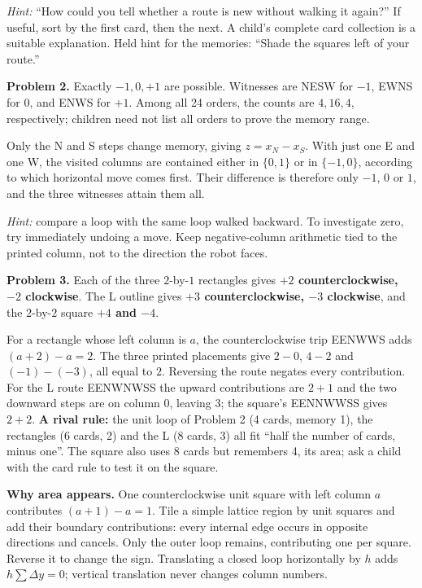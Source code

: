 \documentclass[11pt,letterpaper]{article}
\newcommand{\answer}[1]{\par\vspace{3pt}\textbf{Problem #1.} }
\begin{document}
\textit{Hint:} ``How could you tell whether a route is new without walking it again?'' If useful, sort by the first card, then the next. A child's complete card collection is a suitable explanation. Held hint for the memories: ``Shade the squares left of your route.''

\answer{2} Exactly \textbf{$-1,0,+1$} are possible. Witnesses are NESW for $-1$, EWNS for $0$, and ENWS for $+1$. Among all 24 orders, the counts are $4,16,4$, respectively; children need not list all orders to prove the memory range.

Only the N and S steps change memory, giving $z=x_N-x_S$. With just one E and one W, the visited columns are contained either in $\{0,1\}$ or in $\{-1,0\}$, according to which horizontal move comes first. Their difference is therefore only $-1$, $0$ or $1$, and the three witnesses attain them all.

\textit{Hint:} compare a loop with the same loop walked backward. To investigate zero, try immediately undoing a move. Keep negative-column arithmetic tied to the printed column, not to the direction the robot faces.

\answer{3} Each of the three $2$-by-$1$ rectangles gives \textbf{$+2$ counterclockwise, $-2$ clockwise}. The L outline gives \textbf{$+3$ counterclockwise, $-3$ clockwise}, and the $2$-by-$2$ square \textbf{$+4$ and $-4$}.

For a rectangle whose left column is $a$, the counterclockwise trip EENWWS adds $(a+2)-a=2$. The three printed placements give $2-0$, $4-2$ and $(-1)-(-3)$, all equal to $2$. Reversing the route negates every contribution. For the L route EENWNWSS the upward contributions are $2+1$ and the two downward steps are on column $0$, leaving $3$; the square's EENNWWSS gives $2+2$. \textbf{A rival rule:} the unit loop of Problem 2 (4 cards, memory 1), the rectangles (6 cards, 2) and the L (8 cards, 3) all fit ``half the number of cards, minus one''. The square also uses 8 cards but remembers 4, its area; ask a child with the card rule to test it on the square.

\textbf{Why area appears.} One counterclockwise unit square with left column $a$ contributes $(a+1)-a=1$. Tile a simple lattice region by unit squares and add their boundary contributions: every internal edge occurs in opposite directions and cancels. Only the outer loop remains, contributing one per square. Reverse it to change the sign. Translating a closed loop horizontally by $h$ adds $h\sum\Delta y=0$; vertical translation never changes column numbers.
\end{document}
